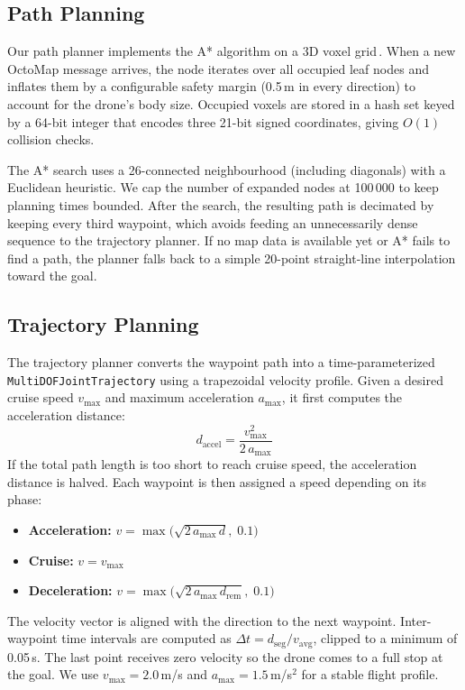 \documentclass[twocolumn]{article}
\begin{document}
\subsection{Path Planning}

Our path planner implements the A* algorithm on a 3D voxel grid\,\cite{Hart1968}.
When a new OctoMap message arrives, the node iterates over all occupied leaf nodes and inflates them by a configurable safety margin (0.5\,m in every direction) to account for the drone's body size.
Occupied voxels are stored in a hash set keyed by a 64-bit integer that encodes three 21-bit signed coordinates, giving $O(1)$ collision checks.

The A* search uses a 26-connected neighbourhood (including diagonals) with a Euclidean heuristic.
We cap the number of expanded nodes at 100\,000 to keep planning times bounded.
After the search, the resulting path is decimated by keeping every third waypoint, which avoids feeding an unnecessarily dense sequence to the trajectory planner.
If no map data is available yet or A* fails to find a path, the planner falls back to a simple 20-point straight-line interpolation toward the goal.


\subsection{Trajectory Planning}

The trajectory planner converts the waypoint path into a time-parameterized \texttt{MultiDOFJointTrajectory} using a trapezoidal velocity profile.
Given a desired cruise speed $v_{\max}$ and maximum acceleration $a_{\max}$, it first computes the acceleration distance:
\begin{equation}
  d_{\text{accel}} = \frac{v_{\max}^2}{2\,a_{\max}}
\end{equation}
If the total path length is too short to reach cruise speed, the acceleration distance is halved.
Each waypoint is then assigned a speed depending on its phase:
\begin{itemize}
  \item \textbf{Acceleration:} $v = \max\!\bigl(\sqrt{2\,a_{\max}\,d},\;0.1\bigr)$
  \item \textbf{Cruise:} $v = v_{\max}$
  \item \textbf{Deceleration:} $v = \max\!\bigl(\sqrt{2\,a_{\max}\,d_{\text{rem}}},\;0.1\bigr)$
\end{itemize}
The velocity vector is aligned with the direction to the next waypoint.
Inter-waypoint time intervals are computed as $\Delta t = d_{\text{seg}} / v_{\text{avg}}$, clipped to a minimum of 0.05\,s.
The last point receives zero velocity so the drone comes to a full stop at the goal.
We use $v_{\max} = 2.0$\,m/s and $a_{\max} = 1.5$\,m/s$^2$ for a stable flight profile.
\end{document}
